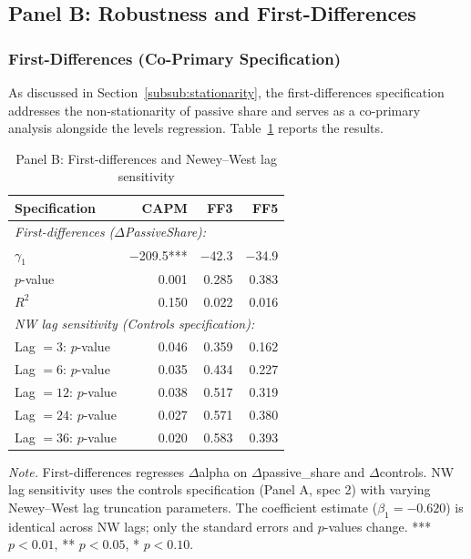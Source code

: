 \documentclass[11pt, a4paper]{article}
\begin{document}
\subsection{Panel B: Robustness and First-Differences}
\label{subsec:panel_b}

\subsubsection{First-Differences (Co-Primary Specification)}

As discussed in Section~\ref{subsub:stationarity}, the first-differences specification addresses the non-stationarity of passive share and serves as a co-primary analysis alongside the levels regression. Table~\ref{tab:panel_b} reports the results.

\begin{table}[H]
\centering
\caption{Panel B: First-differences and Newey--West lag sensitivity}
\label{tab:panel_b}
\small
\begin{tabular}{lrrr}
\toprule
\textbf{Specification} & \textbf{CAPM} & \textbf{FF3} & \textbf{FF5} \\
\midrule
\multicolumn{4}{l}{\textit{First-differences ($\Delta$PassiveShare):}} \\
$\gamma_1$ & $-$209.5*** & $-$42.3 & $-$34.9 \\
$p$-value  & 0.001       & 0.285   & 0.383 \\
$R^2$      & 0.150       & 0.022   & 0.016 \\[6pt]
\multicolumn{4}{l}{\textit{NW lag sensitivity (Controls specification):}} \\
Lag $= 3$:  $p$-value & 0.046  & 0.359 & 0.162 \\
Lag $= 6$:  $p$-value & 0.035  & 0.434 & 0.227 \\
Lag $= 12$: $p$-value & 0.038  & 0.517 & 0.319 \\
Lag $= 24$: $p$-value & 0.027  & 0.571 & 0.380 \\
Lag $= 36$: $p$-value & 0.020  & 0.583 & 0.393 \\
\bottomrule
\end{tabular}
\begin{flushleft}
\small\textit{Note.} First-differences regresses $\Delta$alpha on $\Delta$passive\_share and $\Delta$controls. NW lag sensitivity uses the controls specification (Panel A, spec 2) with varying Newey--West lag truncation parameters. The coefficient estimate ($\beta_1 = -0.620$) is identical across NW lags; only the standard errors and $p$-values change. *** $p<0.01$, ** $p<0.05$, * $p<0.10$.
\end{flushleft}
\end{table}
\end{document}
